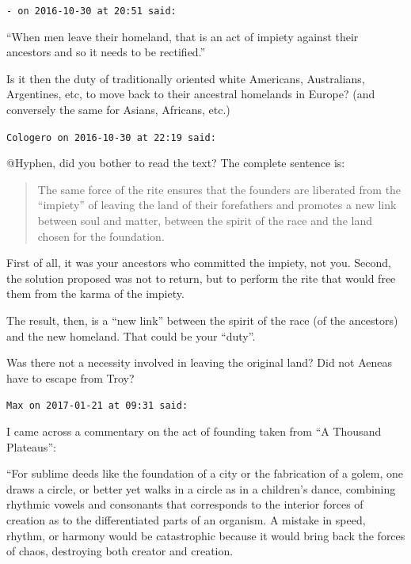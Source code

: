 \begin{footnotesize}
\begin{sffamily}
\texttt{- on 2016-10-30 at 20:51 said:}

``When men leave their homeland, that is an act of impiety against their ancestors and so it needs to be rectified.''

Is it then the duty of traditionally oriented white Americans, Australians, Argentines, etc, to move back to their ancestral homelands in Europe? (and conversely the same for Asians, Africans, etc.)

\hfill

\texttt{Cologero on 2016-10-30 at 22:19 said:}

@Hyphen, did you bother to read the text? The complete sentence is:

\begin{quote}\footnotesize

The same force of the rite ensures that the founders are liberated from the ``impiety'' of leaving the land of their forefathers and promotes a new link between soul and matter, between the spirit of the race and the land chosen for the foundation.
\end{quote}


First of all, it was your ancestors who committed the impiety, not you. Second, the solution proposed was not to return, but to perform the rite that would free them from the karma of the impiety.

The result, then, is a ``new link'' between the spirit of the race (of the ancestors) and the new homeland. That could be your ``duty''.

Was there not a necessity involved in leaving the original land? Did not Aeneas have to escape from Troy?

\hfill

\texttt{Max on 2017-01-21 at 09:31 said:}

I came across a commentary on the act of founding taken from ``A Thousand Plateaus'':

``For sublime deeds like the foundation of a city or the fabrication of a golem, one draws a circle, or better yet walks in a circle as in a children's dance, combining rhythmic vowels and consonants that corresponds to the interior forces of creation as to the differentiated parts of an organism. A mistake in speed, rhythm, or harmony would be catastrophic because it would bring back the forces of chaos, destroying both creator and creation.


\end{sffamily}
\end{footnotesize}
